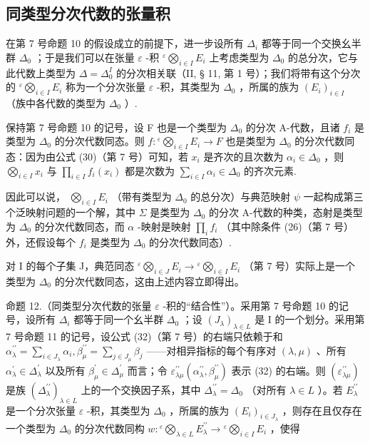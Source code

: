 \subsection{同类型分次代数的张量积}

在第 7 号命题 10 的假设成立的前提下，进一步设所有 \(\Delta_{i}\) 都等于同一个交换幺半群 \(\Delta_{0}\) ；于是我们可以在张量 \(\varepsilon\) -积 \({}^{\varepsilon}\bigotimes_{i\in I}E_{i}\) 上考虑类型为 \(\Delta_{0}\) 的总分次，它与此代数上类型为 \(\Delta = \Delta_{0}^{I}\) 的分次相关联（II, § 11, 第 1 号）；我们将带有这个分次的 \({}^{\varepsilon}\bigotimes_{i\in I}E_{i}\) 称为一个分次张量 \(\varepsilon\) -积，其类型为 \(\Delta_{0}\) ，所属的族为 \((E_{i})_{i\in I}\) （族中各代数的类型为 \(\Delta_{0}\) ）.

保持第 7 号命题 10 的记号，设 F 也是一个类型为 \(\Delta_0\) 的分次 A-代数，且诸 \(f_i\) 是类型为 \(\Delta_0\) 的分次代数同态。则 \(f: {}^{\varepsilon}\bigotimes_{i \in I} E_i \to F\) 也是类型为 \(\Delta_0\) 的分次代数同态：因为由公式 (30)（第 7 号）可知，若 \(x_i\) 是齐次的且次数为 \(\alpha_i \in \Delta_0\) ，则 \(\bigotimes_{i \in I} x_i\) 与 \(\prod_{i \in I} f_i(x_i)\) 都是次数为 \(\sum_{i \in I} \alpha_i \in \Delta_0\) 的齐次元素.

因此可以说， \(\bigotimes_{i\in I}E_i\) （带有类型为 \(\Delta_0\) 的总分次）与典范映射 \(\psi\) 一起构成第三个泛映射问题的一个解，其中 \(\Sigma\) 是类型为 \(\Delta_0\) 的分次 A-代数的种类，态射是类型为 \(\Delta_0\) 的分次代数同态，而 \(\alpha\) -映射是映射 \(\prod_{i}f_{i}\) （其中除条件 (26)（第 7 号）外，还假设每个 \(f_{i}\) 是类型为 \(\Delta_0\) 的分次代数同态）.

对 I 的每个子集 J，典范同态 \({}^{\varepsilon}\bigotimes_{i\in J}E_i\to {}^{\varepsilon}\bigotimes_{i\in I}E_i\) （第 7 号）实际上是一个类型为 \(\Delta_0\) 的分次代数同态，这由上述内容立即得出。

命题 12.（同类型分次代数的张量 \(\varepsilon\) -积的“结合性”）。采用第 7 号命题 10 的记号，设所有 \(\Delta_{i}\) 都等于同一个幺半群 \(\Delta_{0}\) ；设 \((J_{\lambda})_{\lambda \in L}\) 是 I 的一个划分。采用第 7 号命题 11 的记号，设公式 (32)（第 7 号）的右端只依赖于和 \(\alpha_{\lambda}^{\prime \prime} = \sum_{i \in J_{\lambda}} \alpha_{i}, \beta_{\mu}^{\prime \prime} = \sum_{j \in J_{\mu}} \beta_{j}\) ——对相异指标的每个有序对 \((\lambda, \mu)\) 、所有 \(\alpha_{\lambda}^{\prime} \in \Delta_{\lambda}^{\prime}\) 以及所有 \(\beta_{\mu}^{\prime} \in \Delta_{\mu}^{\prime}\) 而言；令 \(\varepsilon_{\lambda \mu}^{\prime \prime}(\alpha_{\lambda}^{\prime \prime}, \beta_{\mu}^{\prime \prime})\) 表示 (32) 的右端。则 \((\varepsilon_{\lambda \mu}^{\prime \prime})\) 是族 \((\Delta_{\lambda}^{\prime \prime})_{\lambda \in L}\) 上的一个交换因子系，其中 \(\Delta_{\lambda}^{\prime \prime} = \Delta_{0}\) （对所有 \(\lambda \in L\) ）。若 \(E_{\lambda}^{\prime \prime}\) 是一个分次张量 \(\varepsilon\) -积，其类型为 \(\Delta_{0}\) ，所属的族为 \((E_{i})_{i \in J_{\lambda}}\) ，则存在且仅存在一个类型为 \(\Delta_{0}\) 的分次代数同构 \(w: {}^{\varepsilon}\bigotimes_{\lambda \in L} E_{\lambda}^{\prime \prime} \to {}^{\varepsilon}\bigotimes_{i \in I} E_{i}\) ，使得

